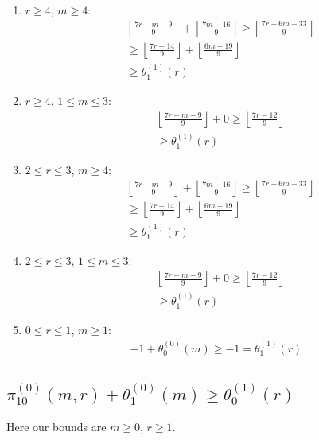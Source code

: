 \documentclass[reqno]{amsart}
\theoremstyle{definition}
\theoremstyle{remark}
\numberwithin{equation}{section}
\begin{document}
\begin{enumerate}
\item $r\ge 4$, $m\ge 4$:
\begin{align*}
&\left\lfloor \frac{7r-m-9}{9} \right\rfloor + \left\lfloor \frac{7m-16}{9} \right\rfloor\ge\left\lfloor \frac{7r+6m-33}{9} \right\rfloor\\
&\ge \left\lfloor \frac{7r-14}{9} \right\rfloor + \left\lfloor \frac{6m-19}{9} \right\rfloor\\
&\ge \theta^{(1)}_1(r)
\end{align*}
\item $r\ge 4$, $1\le m\le 3$:
\begin{align*}
&\left\lfloor \frac{7r-m-9}{9} \right\rfloor + 0\ge \left\lfloor \frac{7r-12}{9} \right\rfloor\\
&\ge \theta^{(1)}_1(r)
\end{align*}
\item $2\le r\le 3$, $m\ge 4$:
\begin{align*}
&\left\lfloor \frac{7r-m-9}{9} \right\rfloor + \left\lfloor \frac{7m-16}{9} \right\rfloor\ge\left\lfloor \frac{7r+6m-33}{9} \right\rfloor\\
&\ge \left\lfloor \frac{7r-14}{9} \right\rfloor + \left\lfloor \frac{6m-19}{9} \right\rfloor\\
&\ge \theta^{(1)}_1(r)
\end{align*}
\item $2\le r\le 3$, $1\le m\le 3$:
\begin{align*}
&\left\lfloor \frac{7r-m-9}{9} \right\rfloor + 0\ge \left\lfloor \frac{7r-12}{9} \right\rfloor\\
&\ge\theta^{(1)}_1(r)
\end{align*}
\item $0\le r\le 1$, $m\ge 1$:
\begin{align*}
-1 + \theta^{(0)}_0(m)\ge -1 = \theta^{(1)}_1(r)
\end{align*}
\end{enumerate}

\subsection{$\displaystyle{\pi^{(0)}_{10}(m,r)+\theta^{(0)}_1(m)\ge\theta^{(1)}_0(r)}$}

Here our bounds are $m\ge 0$, $r\ge 1$.\\
\end{document}
